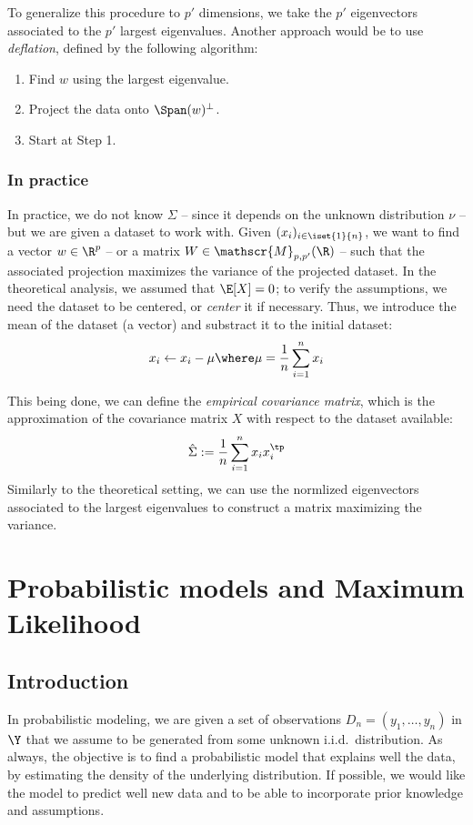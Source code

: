 \documentclass[toc, titlepaged]{../cs-classes/cs-classes}
\begin{document}
\begin{remark}
    To generalize this procedure to $p'$ dimensions, we take the $p'$ eigenvectors associated to the $p'$ largest eigenvalues. Another approach would be to use \emph{deflation}, defined by the following algorithm:
    \begin{enumerate}
        \item Find $w$ using the largest eigenvalue.
        \item Project the data onto $\Span(w)^\perp$.
        \item Start at Step 1.
    \end{enumerate}
\end{remark}

\subsubsection{In practice}
In practice, we do not know $\Sigma$ -- since it depends on the unknown distribution $\nu$ -- but we are given a dataset to work with. Given $(x_i)_{i\in\iset{1}{n}}$, we want to find a vector $w\in\R^p$ -- or a matrix $W\in\mathscr{M}_{p, p'}(\R)$ -- such that the associated projection maximizes the variance of the projected dataset. In the theoretical analysis, we assumed that $\E[X]=0$; to verify the assumptions, we need the dataset to be centered, or \emph{center} it if necessary. Thus, we introduce the mean of the dataset (a vector) and substract it to the initial dataset:
\begin{equation*}
    x_i\leftarrow x_i-\mu \where \mu=\frac{1}{n}\sum_{i=1}^n x_i
\end{equation*}

This being done, we can define the \emph{empirical covariance matrix}, which is the approximation of the covariance matrix $X$ with respect to the dataset available:
\begin{equation*}
    \hat{\Sigma} := \frac{1}{n} \sum_{i=1}^n  x_ix_i^\tp
\end{equation*}
Similarly to the theoretical setting, we can use the normlized eigenvectors associated to the largest eigenvalues to construct a matrix maximizing the variance.

\section{Probabilistic models and Maximum Likelihood}
\subsection{Introduction}
In probabilistic modeling, we are given a set of observations $D_n=(y_1, \dots, y_n)$ in $\Y$ that we assume to be generated from some unknown i.i.d.~distribution. As always, the objective is to find a probabilistic model that explains well the data, by estimating the density of the underlying distribution. If possible, we would like the model to predict well new data and to be able to incorporate prior knowledge and assumptions.
\end{document}
